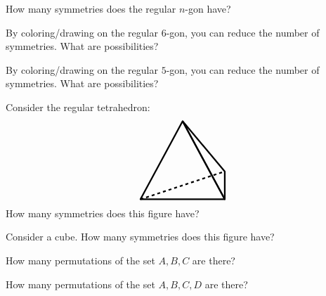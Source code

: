 \documentclass[handout,noauthor,nooutcomes]{ximera}
\begin{document}
\begin{problem}
  How many symmetries does the regular $n$-gon have?
\end{problem}

\begin{problem}
  By coloring/drawing on the regular $6$-gon, you can reduce the
  number of symmetries. What are possibilities?
\end{problem}


\begin{problem}
  By coloring/drawing on the regular $5$-gon, you can reduce the
  number of symmetries. What are possibilities?
\end{problem}


\begin{problem}
  Consider the regular tetrahedron:
  \[
  \begin{tikzpicture}
    \draw[ultra thick,rounded corners=.05mm] (0,0) -- (3,0) -- (1.5,2.8) -- cycle;
    \draw[ultra thick,rounded corners=.05mm] (3,1) -- (3,0) -- (1.5,2.8) -- cycle;
    \draw[ultra thick,dashed] (0,0) -- (3,1);
  \end{tikzpicture}
  \]
  How many symmetries does this figure have?
\end{problem}


\begin{problem}
  Consider a cube. How many symmetries does this figure have?
\end{problem}


\begin{problem}
  How many permutations of the set ${A,B,C}$ are there?
\end{problem}


\begin{problem}
  How many permutations of the set ${A,B,C,D}$ are there?
\end{problem}
\end{document}

